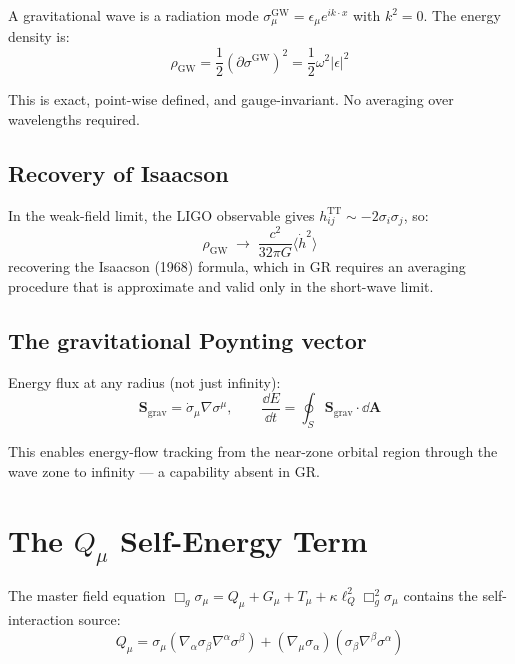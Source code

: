 \documentclass[11pt,a4paper]{article}
\theoremstyle{plain}
\theoremstyle{definition}
\theoremstyle{remark}
\newcommand{\lQ}{\ell_Q}
\begin{document}
A gravitational wave is a radiation mode $\sigma_\mu^{\mathrm{GW}} = \epsilon_\mu e^{ik\cdot x}$ with $k^2 = 0$.  The energy density is:
\begin{equation}
  \boxed{\rho_{\mathrm{GW}} = \frac{1}{2}(\partial\sigma^{\mathrm{GW}})^2 = \frac{1}{2}\omega^2|\epsilon|^2}
  \label{eq:rho_gw}
\end{equation}

This is exact, point-wise defined, and gauge-invariant.  No averaging over wavelengths required.

\subsection{Recovery of Isaacson}

In the weak-field limit, the LIGO observable gives $h_{ij}^{\mathrm{TT}} \sim -2\sigma_i\sigma_j$, so:
\begin{equation}
  \rho_{\mathrm{GW}} \;\longrightarrow\; \frac{c^2}{32\pi G}\langle\dot h^2\rangle
\end{equation}
recovering the Isaacson (1968) formula, which in GR requires an averaging procedure that is approximate and valid only in the short-wave limit.

\subsection{The gravitational Poynting vector}

Energy flux at any radius (not just infinity):
\begin{equation}
  \boxed{\mathbf{S}_{\mathrm{grav}} = \dot\sigma_\mu\nabla\sigma^\mu, \qquad \frac{\dd E}{\dd t} = \oint_S\mathbf{S}_{\mathrm{grav}}\cdot\dd\mathbf{A}}
  \label{eq:poynting}
\end{equation}

This enables energy-flow tracking from the near-zone orbital region through the wave zone to infinity --- a capability absent in GR.

\section{The $Q_\mu$ Self-Energy Term}
\label{sec:Q}

The master field equation $\Box_g\sigma_\mu = Q_\mu + G_\mu + T_\mu + \kappa\lQ^2\Box_g^2\sigma_\mu$ contains the self-interaction source:
\begin{equation}
  Q_\mu = \sigma_\mu(\nabla_\alpha\sigma_\beta\nabla^\alpha\sigma^\beta) + (\nabla_\mu\sigma_\alpha)(\sigma_\beta\nabla^\beta\sigma^\alpha)
\end{equation}
\end{document}

